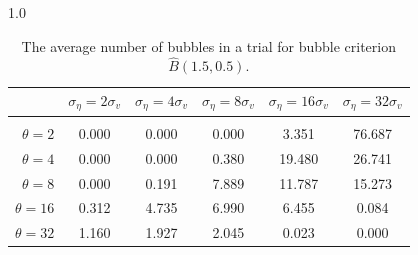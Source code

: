 \documentclass[12pt]{article}
\begin{document}
\begin{table}[h!]
\vspace{10pt}
\begin{subtable}{1.0\textwidth}
    \centering
\begin{tabular}{rccccc}
\hline  
            & \multicolumn{1}{l}{$\sigma_{\eta} =2\sigma_{v}$} & \multicolumn{1}{l}{$\sigma_{\eta} =4\sigma_{v}$} & \multicolumn{1}{l}{$\sigma_{\eta} =8\sigma_{v}$} & \multicolumn{1}{l}{$\sigma_{\eta} =16\sigma_{v}$} & \multicolumn{1}{l}{$\sigma_{\eta} =32\sigma_{v}$} \\ \hline  \vspace{-3mm} \\        
$\theta=2$  & 0.000                                             & 0.000                                             & 0.000                                             & 3.351                                              & 76.687                                             \\ \hline
$\theta=4$  & 0.000                                             & 0.000                                             & 0.380                                             & 19.480                                             & 26.741                                             \\ \hline
$\theta=8$  & 0.000                                             & 0.191                                             & 7.889                                             & 11.787                                             & 15.273                                             \\ \hline
$\theta=16$ & 0.312                                             & 4.735                                             & 6.990                                             & 6.455                                              & 0.084                                              \\ \hline
$\theta=32$ & 1.160                                             & 1.927                                             & 2.045                                             & 0.023                                              & 0.000                                              \\ \hline
\end{tabular}
\end{subtable}
\caption{The average number of bubbles in a trial for bubble criterion $\widehat{B}(1.5,0.5)$.}
\label{bubcountsamps}
\end{table}
\pagebreak
\end{document}
